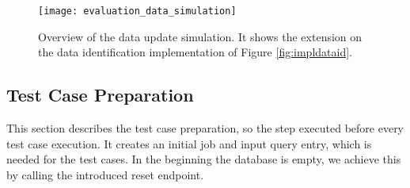 \documentclass[draft,final]{vutinfth} %
\begin{document}
\begin{figure}[h]
	\centering
	\texttt{[image: evaluation\_data\_simulation]}
	\caption{Overview of the data update simulation. It shows the extension on the data identification implementation of Figure \ref{fig:impldataid}.}
	\label{fig:eva_data_simulation} %
\end{figure}

\subsection{Test Case Preparation}
This section describes the test case preparation, so the step executed before every test case execution. It creates an initial job and input query entry, which is needed for the test cases. In the beginning the database is empty, we achieve this by calling the introduced reset endpoint. \\ 
\end{document}
